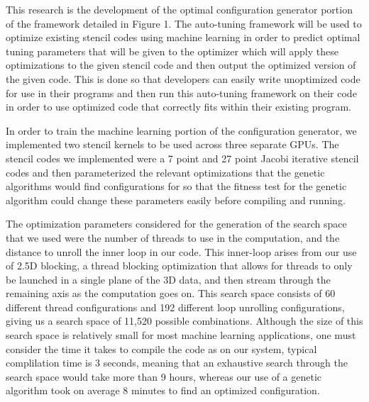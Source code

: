 \documentclass[conference]{IEEEtran}
\newcommand {\todo}[1] {\textcolor{red}{#1}}
\begin{document}
	This research is the development of the optimal configuration generator portion of the framework detailed in Figure 1. The auto-tuning framework will be used to optimize existing stencil codes using machine learning in order to predict optimal tuning parameters that will be given to the optimizer which will apply these optimizations to the given stencil code and then output the optimized version of the given code. This is done so that developers can easily write unoptimized code for use in their programs and then run this auto-tuning framework on their code in order to use optimized code that correctly fits within their existing program.

	In order to train the machine learning portion of the configuration generator, we implemented two stencil kernels to be used across three separate GPUs. The stencil codes we implemented were a 7 point and 27 point Jacobi iterative stencil codes and then parameterized the relevant optimizations that the genetic algorithms would find configurations for so that the fitness test for the genetic algorithm could change these parameters easily before compiling and running.

	The optimization parameters considered for the generation of the search space that we used were the number of threads to use in the computation, and the distance to unroll the inner loop in our code. This inner-loop arises from our use of 2.5D blocking, a thread blocking optimization that allows for threads to only be launched in a single plane of the 3D data, and then stream through the remaining axis as the computation goes on. This search space consists of 60 different thread configurations and 192 different loop unrolling configurations, giving us a search space of 11,520 possible combinations. Although the size of this search space is relatively small for most machine learning applications, one must consider the time it takes to compile the code as on our system, typical complilation time is 3 seconds, meaning that an exhaustive search through the search space would take more than 9 hours, whereas our use of a genetic algorithm took on average 8 minutes to find an optimized configuration.
\end{document}

